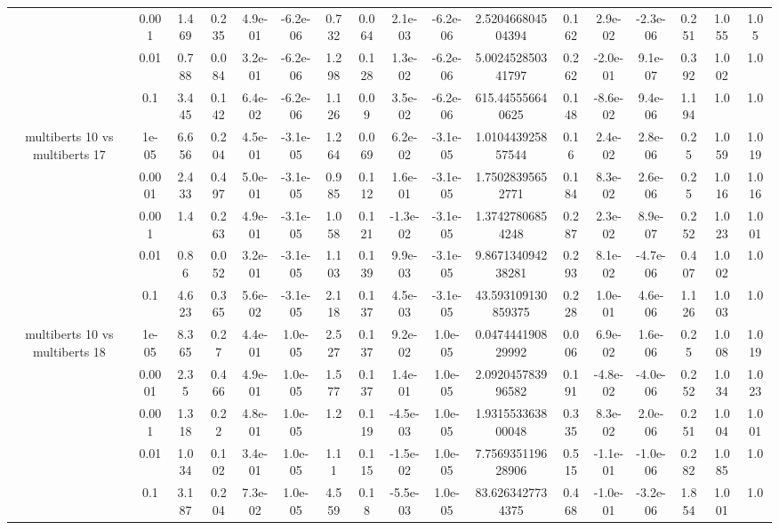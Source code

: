 \begin{tabular}{|c|c|c|c|c|c|c|c|c|c|c|c|c|c|c|c|c|}
 & 0.001 & 1.469 & 0.235 & 4.9e-01 & -6.2e-06 & 0.732 & 0.064 & 2.1e-03 & -6.2e-06 & 2.520466804504394 & 0.162 & 2.9e-02 & -2.3e-06 & 0.251 & 1.055 & 1.05 \\
 & 0.01 & 0.788 & 0.084 & 3.2e-01 & -6.2e-06 & 1.298 & 0.128 & 1.3e-02 & -6.2e-06 & 5.002452850341797 & 0.262 & -2.0e-01 & 9.1e-07 & 0.392 & 1.002 & 1.0 \\
 & 0.1 & 3.445 & 0.142 & 6.4e-02 & -6.2e-06 & 1.126 & 0.09 & 3.5e-02 & -6.2e-06 & 615.445556640625 & 0.148 & -8.6e-02 & 9.4e-06 & 1.194 & 1.0 & 1.0 \\
\hline
\multirow{5}{*}{multiberts 10 vs multiberts 17} & 1e-05 & 6.656 & 0.204 & 4.5e-01 & -3.1e-05 & 1.264 & 0.069 & 6.2e-02 & -3.1e-05 & 1.010443925857544 & 0.16 & 2.4e-02 & 2.8e-06 & 0.25 & 1.059 & 1.019 \\
 & 0.0001 & 2.433 & 0.497 & 5.0e-01 & -3.1e-05 & 0.985 & 0.112 & 1.6e-01 & -3.1e-05 & 1.75028395652771 & 0.184 & 8.3e-02 & 2.6e-06 & 0.25 & 1.016 & 1.016 \\
 & 0.001 & 1.4 & 0.263 & 4.9e-01 & -3.1e-05 & 1.058 & 0.121 & -1.3e-02 & -3.1e-05 & 1.37427806854248 & 0.287 & 2.3e-02 & 8.9e-07 & 0.252 & 1.023 & 1.001 \\
 & 0.01 & 0.86 & 0.052 & 3.2e-01 & -3.1e-05 & 1.103 & 0.139 & 9.9e-03 & -3.1e-05 & 9.867134094238281 & 0.293 & 8.1e-02 & -4.7e-06 & 0.407 & 1.002 & 1.0 \\
 & 0.1 & 4.623 & 0.365 & 5.6e-02 & -3.1e-05 & 2.118 & 0.137 & 4.5e-03 & -3.1e-05 & 43.593109130859375 & 0.228 & 1.0e-01 & 4.6e-06 & 1.126 & 1.003 & 1.0 \\
\hline
\multirow{5}{*}{multiberts 10 vs multiberts 18} & 1e-05 & 8.365 & 0.27 & 4.4e-01 & 1.0e-05 & 2.527 & 0.137 & 9.2e-02 & 1.0e-05 & 0.047444190829992 & 0.006 & 6.9e-02 & 1.6e-06 & 0.25 & 1.008 & 1.019 \\
 & 0.0001 & 2.35 & 0.466 & 4.9e-01 & 1.0e-05 & 1.577 & 0.137 & 1.4e-01 & 1.0e-05 & 2.092045783996582 & 0.191 & -4.8e-02 & -4.0e-06 & 0.252 & 1.034 & 1.023 \\
 & 0.001 & 1.318 & 0.22 & 4.8e-01 & 1.0e-05 & 1.2 & 0.119 & -4.5e-03 & 1.0e-05 & 1.931553363800048 & 0.335 & 8.3e-02 & 2.0e-06 & 0.251 & 1.004 & 1.001 \\
 & 0.01 & 1.034 & 0.102 & 3.4e-01 & 1.0e-05 & 1.11 & 0.115 & -1.5e-02 & 1.0e-05 & 7.756935119628906 & 0.515 & -1.1e-01 & -1.0e-06 & 0.282 & 1.085 & 1.0 \\
 & 0.1 & 3.187 & 0.204 & 7.3e-02 & 1.0e-05 & 4.559 & 0.18 & -5.5e-03 & 1.0e-05 & 83.6263427734375 & 0.468 & -1.0e-01 & -3.2e-06 & 1.854 & 1.001 & 1.0 \\

\end{tabular}
